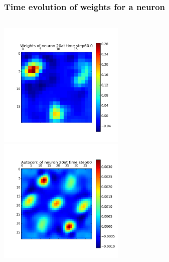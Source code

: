 \begin{frame}
\frametitle{Time evolution of weights for a neuron}
\begin{columns}[t]
\centering
\includegraphics[width=6cm,height=6cm]{neurons/neuron_w_20_t_60.png}\\
\centering
\includegraphics[width=6cm,height=6cm]{neurons/neuron_a_20_t_60.png}\\
\end{columns}
\end{frame}


